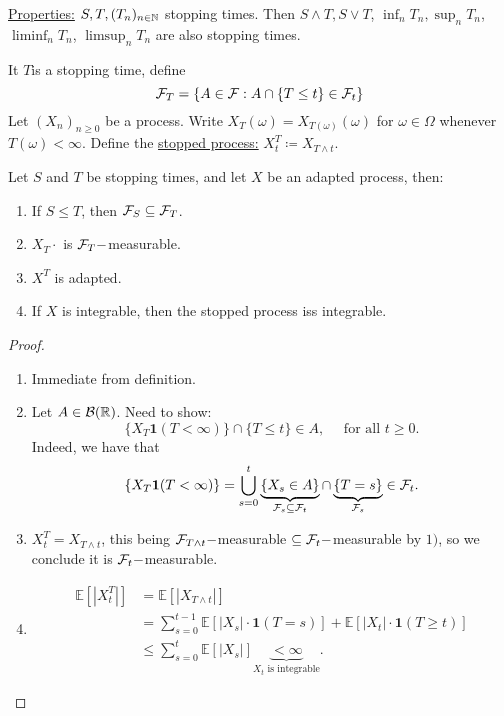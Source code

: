 \documentclass{article}
\begin{document}
\underline{Properties:} $ S,T, (T_{n})_{n\in\mathbb{N}}$ stopping times. Then $ S\land T, S\lor T$, $ \displaystyle\inf_{n}T_{n}, \displaystyle\sup_{n}T_{n}$, $ \displaystyle\liminf_{n}T_{n}$, $ \displaystyle\limsup_{n}T_{n}$ are also stopping times.

\begin{boxdef}\label{def: stopping time sigma algebra}
It $ T$is a stopping time, define 
\[
	\mathcal{F}_{T}=\{A\in \mathcal{F}: A\cap \{T\leq t \}\in \mathcal{F}_{t}\}
\]
Let $ (X_{n})_{n\geq 0}$ be a process. Write $ X_{T}(\omega) = X_{T(\omega)}(\omega)$ for $ \omega \in \Omega$ whenever $ T(\omega)<\infty$. Define the \underline{stopped process:} $ X^{T}_{t}\coloneqq X_{T\land t}$.
\end{boxdef}


\begin{boxprop}\label{prop: stopping time discrete}
	Let $ S$ and $ T$ be stopping times, and let $ X$ be an adapted process, then:
	\begin{enumerate}
		\item If $ S\leq T$, then $ \mathcal{F}_{S}\subseteq\mathcal{F}_{T}$.
		\item $ X_{T}\cdot$ is $ \mathcal{F}_{T}-$measurable.
		\item $ X^{T}$ is adapted. 
		\item If $ X$ is integrable, then the stopped process iss integrable.
	\end{enumerate}
	
\end{boxprop}
\begin{proof}
    \begin{enumerate}
	    \item Immediate from definition.
	    \item Let $ A\in \mathcal{B}(\mathbb{R})$. Need to show: 
		    \[
			    \{X_{T} \mathbf{1}(T<\infty)\}\cap \{T\leq t\} \in A, \quad \text{ for all }t\geq 0.
		    \]
Indeed, we have that 
\[
	\{X_{T} \mathbf{1}(T<\infty)\} =\displaystyle\bigcup^{t}_{s=0}\underbrace{\{X_{s}\in A\}}_{\mathcal{F}_{s}\subseteq \mathcal{F}_{t}}\cap \underbrace{\{T = s\}}_{\mathcal{F}_{s}}\in \mathcal{F}_{t}.
\]

\item $ X^{T}_{t} = X_{T\land t}$, this being $ \mathcal{F}_{T\land t}-$measurable $ \subseteq\mathcal{F}_{t}-$measurable by $ 1)$, so we conclude it is $ \mathcal{F}_{t}-$measurable.

\item 
	\[
	\begin{array}{ll}
		\mathbb{E}[|X_{t}^{T}|] &=\mathbb{E}[|X_{T\land t}|] \\
					&=\displaystyle\sum^{t-1}_{s=0}\mathbb{E}[|X_{s}|\cdot \mathbf{1}(T = s)]+\mathbb{E}[|X_{t}|\cdot \mathbf{1}(T\geq t)]\\ 
					&\leq\displaystyle\sum^{ t}_{s=0}\mathbb{E}[|X_{s}|]\underbrace{<\infty}_{X_{t} \text{ is integrable}}.
	\end{array}
	\]
	
    \end{enumerate}
    
\end{proof}
\end{document}
